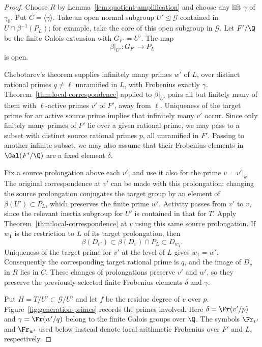 \begin{proof}
Choose $R$ by Lemma~\ref{lem:quotient-amplification} and choose any
lift $\gamma$ of $\gamma_0$. Put $C=\langle\gamma\rangle$.
Take an open normal subgroup $U'\trianglelefteq\mathcal G$ contained
in $U\cap\beta^{-1}(P_L)$; for example, take the core of this open
subgroup in $\mathcal G$. Let $F'/\Q$ be the finite Galois extension
with $G_{F'}=U'$. The map
\[
 \beta|_{U'}:G_{F'}\longrightarrow P_L
\]
is open.

Chebotarev's theorem supplies infinitely many primes $w'$ of $L$,
over distinct rational primes $q\ne\ell$ unramified in $L$, with
Frobenius exactly $\gamma$. Theorem~\ref{thm:local-correspondence}
applied to $\beta|_{U'}$ pairs all but finitely many of them with
$\ell$-active primes $v'$ of $F'$, away from $\ell$.
Uniqueness of the target prime for an active source prime implies
that infinitely many $v'$ occur. Since only finitely many primes of
$F'$ lie over a given rational prime, we may pass to a subset with
distinct source rational primes $p$, all unramified in $F'$.
Passing to another infinite subset, we may also assume that their
Frobenius elements in $\Gal(F'/\Q)$ are a fixed element $\delta$.

Fix a source prolongation above each $v'$, and use it also for the
prime $v=v'|_k$. The original correspondence at $v'$ can be made
with this prolongation: changing the source prolongation conjugates
the target group by an element of $\beta(U')\subset P_L$, which
preserves the finite prime $w'$. Activity passes from $v'$ to $v$,
since the relevant inertia subgroup for $U'$ is contained in that
for $T$. Apply Theorem~\ref{thm:local-correspondence} at $v$ using
this same source prolongation. If $w_1$ is the restriction to $L$
of its target prolongation, then
\[
 \beta(D_{v'})\subset\beta(D_v)\cap P_L\subset D_{w_1}.
\]
Uniqueness of the target prime for $v'$ at the level of $L$ gives
$w_1=w'$. Consequently the corresponding target rational prime
is $q$, and the image of $D_v$ in $R$ lies in $C$.
These changes of prolongations preserve $v'$ and $w'$, so they
preserve the previously selected finite Frobenius elements
$\delta$ and $\gamma$.

Put $H=T/U'\subset\mathcal G/U'$ and let $f$ be the residue degree
of $v$ over $p$. Figure~\ref{fig:generation-primes} records the
primes involved. Here $\delta=\Fr(v'/p)$ and
$\gamma=\Fr(w'/q)$ belong to the finite Galois groups over $\Q$.
The symbols $\Fr_{v'}$ and $\Fr_{w'}$ used below instead denote
local arithmetic Frobenius over $F'$ and $L$, respectively.


\end{proof}
